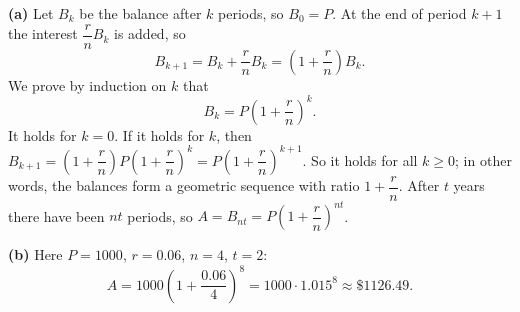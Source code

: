 \textbf{(a)} Let $B_k$ be the balance after $k$ periods, so $B_0=P$. At the end of period $k+1$ the interest $\dfrac {r}{n} B_k$ is added, so
\[B_{k+1}=B_k+\dfrac {r}{n}B_k=\left(1+\dfrac {r}{n}\right)B_k .\]
We prove by induction on $k$ that
\[B_k=P\left(1+\dfrac {r}{n}\right)^k .\]
It holds for $k=0$. If it holds for $k$, then $B_{k+1}=\left(1+\dfrac {r}{n}\right)P\left(1+\dfrac {r}{n}\right)^k=P\left(1+\dfrac {r}{n}\right)^{k+1}$. So it holds for all $k\ge0$; in other words, the balances form a geometric sequence with ratio $1+\dfrac {r}{n}$. After $t$ years there have been $nt$ periods, so $A=B_{nt}=P\left(1+\dfrac {r}{n}\right)^{nt}$.

\textbf{(b)} Here $P=1000$, $r=0.06$, $n=4$, $t=2$:
\[A=1000\left(1+\dfrac{0.06}{4}\right)^{8}=1000\cdot1.015^8\approx\boxed{\$1126.49}.\]
